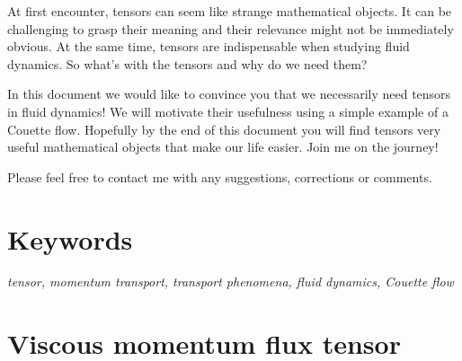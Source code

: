 \documentclass[10pt,twocolumn]{article}
\begin{document}
At first encounter, tensors can seem like strange mathematical objects. It can be challenging to grasp their meaning and their relevance might not be immediately obvious. At the same time, tensors are indispensable when studying fluid dynamics. So what's with the tensors and why do we need them?

In this document we would like to convince you that we necessarily need tensors in fluid dynamics! We will motivate their usefulness using a simple example of a Couette flow. Hopefully by the end of this document you will find tensors very useful mathematical objects that make our life easier. Join me on the journey!

Please feel free to contact me with any suggestions, corrections or comments.

\section*{Keywords}

\textit{tensor, momentum transport, transport phenomena, fluid dynamics, Couette flow}


\section*{Viscous momentum flux tensor}
\end{document}
